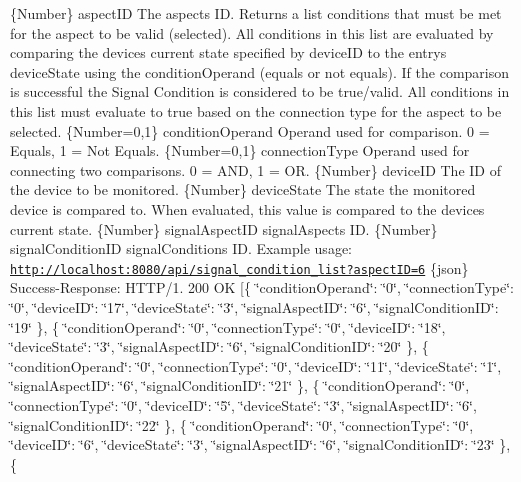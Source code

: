 \{Number\} aspect\+ID The aspect\textquotesingle{}s ID.  Returns a list conditions that must be met for the aspect to be valid (selected). All conditions in this list are evaluated by comparing the device\textquotesingle{}s current state specified by device\+ID to the entry\textquotesingle{}s device\+State using the condition\+Operand (equals or not equals). If the comparison is successful the Signal Condition is considered to be true/valid. All conditions in this list must evaluate to true based on the connection type for the aspect to be selected.  \{Number=0,1\} condition\+Operand Operand used for comparison. 0 = Equals, 1 = Not Equals.  \{Number=0,1\} connection\+Type Operand used for connecting two comparisons. 0 = A\+ND, 1 = OR.  \{Number\} device\+ID The ID of the device to be monitored.  \{Number\} device\+State The state the monitored device is compared to. When evaluated, this value is compared to the device\textquotesingle{}s current state.  \{Number\} signal\+Aspect\+ID signal\+Aspect\textquotesingle{}s ID.  \{Number\} signal\+Condition\+ID signal\+Condition\textquotesingle{}s ID.  Example usage\+: \href{http://localhost:8080/api/signal_condition_list?aspectID=6}{\tt http\+://localhost\+:8080/api/signal\+\_\+condition\+\_\+list?aspect\+I\+D=6}  \{json\} Success-\/\+Response\+: H\+T\+T\+P/1. 200 OK \mbox{[}\{ \char`\"{}condition\+Operand\char`\"{}\+: \char`\"{}0\char`\"{}, \char`\"{}connection\+Type\char`\"{}\+: \char`\"{}0\char`\"{}, \char`\"{}device\+I\+D\char`\"{}\+: \char`\"{}17\char`\"{}, \char`\"{}device\+State\char`\"{}\+: \char`\"{}3\char`\"{}, \char`\"{}signal\+Aspect\+I\+D\char`\"{}\+: \char`\"{}6\char`\"{}, \char`\"{}signal\+Condition\+I\+D\char`\"{}\+: \char`\"{}19\char`\"{} \}, \{ \char`\"{}condition\+Operand\char`\"{}\+: \char`\"{}0\char`\"{}, \char`\"{}connection\+Type\char`\"{}\+: \char`\"{}0\char`\"{}, \char`\"{}device\+I\+D\char`\"{}\+: \char`\"{}18\char`\"{}, \char`\"{}device\+State\char`\"{}\+: \char`\"{}3\char`\"{}, \char`\"{}signal\+Aspect\+I\+D\char`\"{}\+: \char`\"{}6\char`\"{}, \char`\"{}signal\+Condition\+I\+D\char`\"{}\+: \char`\"{}20\char`\"{} \}, \{ \char`\"{}condition\+Operand\char`\"{}\+: \char`\"{}0\char`\"{}, \char`\"{}connection\+Type\char`\"{}\+: \char`\"{}0\char`\"{}, \char`\"{}device\+I\+D\char`\"{}\+: \char`\"{}11\char`\"{}, \char`\"{}device\+State\char`\"{}\+: \char`\"{}1\char`\"{}, \char`\"{}signal\+Aspect\+I\+D\char`\"{}\+: \char`\"{}6\char`\"{}, \char`\"{}signal\+Condition\+I\+D\char`\"{}\+: \char`\"{}21\char`\"{} \}, \{ \char`\"{}condition\+Operand\char`\"{}\+: \char`\"{}0\char`\"{}, \char`\"{}connection\+Type\char`\"{}\+: \char`\"{}0\char`\"{}, \char`\"{}device\+I\+D\char`\"{}\+: \char`\"{}5\char`\"{}, \char`\"{}device\+State\char`\"{}\+: \char`\"{}3\char`\"{}, \char`\"{}signal\+Aspect\+I\+D\char`\"{}\+: \char`\"{}6\char`\"{}, \char`\"{}signal\+Condition\+I\+D\char`\"{}\+: \char`\"{}22\char`\"{} \}, \{ \char`\"{}condition\+Operand\char`\"{}\+: \char`\"{}0\char`\"{}, \char`\"{}connection\+Type\char`\"{}\+: \char`\"{}0\char`\"{}, \char`\"{}device\+I\+D\char`\"{}\+: \char`\"{}6\char`\"{}, \char`\"{}device\+State\char`\"{}\+: \char`\"{}3\char`\"{}, \char`\"{}signal\+Aspect\+I\+D\char`\"{}\+: \char`\"{}6\char`\"{}, \char`\"{}signal\+Condition\+I\+D\char`\"{}\+: \char`\"{}23\char`\"{} \}, \{ 